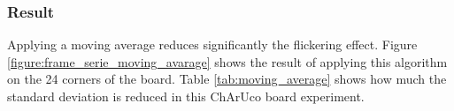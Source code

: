 



\subsubsection{Result}
\label{section:results_flickering}

Applying a moving average reduces significantly the flickering effect. Figure \ref{figure:frame_serie_moving_avarage} shows the result of applying this algorithm on the 24 corners of the board. Table \ref{tab:moving_average} shows how much the standard deviation is reduced in this ChArUco board experiment.

